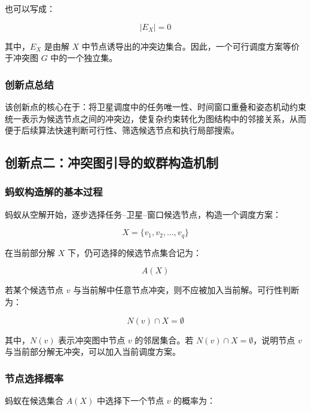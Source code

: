\documentclass[UTF8,a4paper,12pt]{ctexart}
\begin{document}
也可以写成：

\begin{equation}
|E_X|=0
\end{equation}

其中，$E_X$ 是由解 $X$ 中节点诱导出的冲突边集合。因此，一个可行调度方案等价于冲突图 $G$ 中的一个独立集。

\subsubsection{创新点总结}

该创新点的核心在于：将卫星调度中的任务唯一性、时间窗口重叠和姿态机动约束统一表示为候选节点之间的冲突边，使复杂约束转化为图结构中的邻接关系，从而便于后续算法快速判断可行性、筛选候选节点和执行局部搜索。

\subsection{创新点二：冲突图引导的蚁群构造机制}

\subsubsection{蚂蚁构造解的基本过程}

蚂蚁从空解开始，逐步选择任务--卫星--窗口候选节点，构造一个调度方案：

\begin{equation}
X=\{v_1,v_2,\dots,v_q\}
\end{equation}

在当前部分解 $X$ 下，仍可选择的候选节点集合记为：

\begin{equation}
A(X)
\end{equation}

若某个候选节点 $v$ 与当前解中任意节点冲突，则不应被加入当前解。可行性判断为：

\begin{equation}
N(v)\cap X=\emptyset
\end{equation}

其中，$N(v)$ 表示冲突图中节点 $v$ 的邻居集合。若 $N(v)\cap X=\emptyset$，说明节点 $v$ 与当前部分解无冲突，可以加入当前调度方案。

\subsubsection{节点选择概率}

蚂蚁在候选集合 $A(X)$ 中选择下一个节点 $v$ 的概率为：
\end{document}
